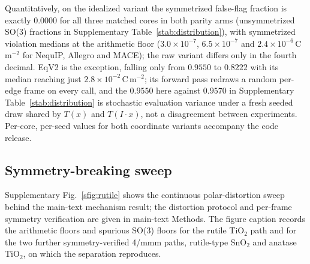 Quantitatively, on the idealized variant the symmetrized false-flag fraction is exactly $0.0000$ for all three matched cores in both parity arms (unsymmetrized SO(3) fractions in Supplementary Table~\ref{stab:distribution}), with symmetrized violation medians at the arithmetic floor ($3.0\times10^{-7}$, $6.5\times10^{-7}$ and $2.4\times10^{-6}$\,C\,m$^{-2}$ for NequIP, Allegro and MACE); the raw variant differs only in the fourth decimal. EqV2 is the exception, falling only from $0.9550$ to $0.8222$ with its median reaching just $2.8\times10^{-2}$\,C\,m$^{-2}$; its forward pass redraws a random per-edge frame on every call, and the $0.9550$ here against $0.9570$ in Supplementary Table~\ref{stab:distribution} is stochastic evaluation variance under a fresh seeded draw shared by $T(x)$ and $T(I\!\cdot\!x)$, not a disagreement between experiments. Per-core, per-seed values for both coordinate variants accompany the code release.


\label{snote:named}

\subsection*{Symmetry-breaking sweep}

Supplementary Fig.~\ref{sfig:rutile} shows the continuous polar-distortion sweep behind the main-text mechanism result; the distortion protocol and per-frame symmetry verification are given in main-text Methods. The figure caption records the arithmetic floors and spurious SO(3) floors for the rutile TiO$_2$ path and for the two further symmetry-verified 4/mmm paths, rutile-type SnO$_2$ and anatase TiO$_2$, on which the separation reproduces.


